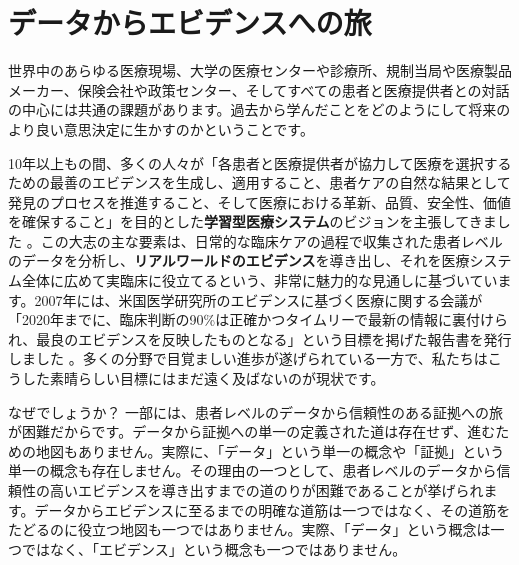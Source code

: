 \documentclass[
  11pt]{book}
\theoremstyle{definition}
\theoremstyle{definition}
\theoremstyle{definition}
\theoremstyle{definition}
\theoremstyle{remark}
\begin{document}
\section{データからエビデンスへの旅}\label{ux30c7ux30fcux30bfux304bux3089ux30a8ux30d3ux30c7ux30f3ux30b9ux3078ux306eux65c5}

世界中のあらゆる医療現場、大学の医療センターや診療所、規制当局や医療製品メーカー、保険会社や政策センター、そしてすべての患者と医療提供者との対話の中心には共通の課題があります。過去から学んだことをどのようにして将来のより良い意思決定に生かすのかということです。

10年以上もの間、多くの人々が「各患者と医療提供者が協力して医療を選択するための最善のエビデンスを生成し、適用すること、患者ケアの自然な結果として発見のプロセスを推進すること、そして医療における革新、品質、安全性、価値を確保すること」を目的とした\textbf{学習型医療システム}のビジョンを主張してきました \citep{olsen2007learning} 。この大志の主な要素は、日常的な臨床ケアの過程で収集された患者レベルのデータを分析し、\textbf{リアルワールドのエビデンス}を導き出し、それを医療システム全体に広めて実臨床に役立てるという、非常に魅力的な見通しに基づいています。2007年には、米国医学研究所のエビデンスに基づく医療に関する会議が「2020年までに、臨床判断の90\%は正確かつタイムリーで最新の情報に裏付けられ、最良のエビデンスを反映したものとなる」という目標を掲げた報告書を発行しました \citep{olsen2007learning}。多くの分野で目覚ましい進歩が遂げられている一方で、私たちはこうした素晴らしい目標にはまだ遠く及ばないのが現状です。

なぜでしょうか？ 一部には、患者レベルのデータから信頼性のある証拠への旅が困難だからです。データから証拠への単一の定義された道は存在せず、進むための地図もありません。実際に、「データ」という単一の概念や「証拠」という単一の概念も存在しません。その理由の一つとして、患者レベルのデータから信頼性の高いエビデンスを導き出すまでの道のりが困難であることが挙げられます。データからエビデンスに至るまでの明確な道筋は一つではなく、その道筋をたどるのに役立つ地図も一つではありません。実際、「データ」という概念は一つではなく、「エビデンス」という概念も一つではありません。
\end{document}
